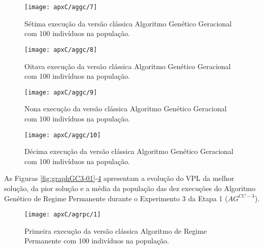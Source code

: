 \begin{figure}[H]
\centering
\texttt{[image: apxC/aggc/7]}
\caption{Sétima execução da versão clássica Algoritmo Genético Geracional com 100 indivíduos na população.}
\label{fig:graphGC3-07}
\end{figure}

\begin{figure}[H]
\centering
\texttt{[image: apxC/aggc/8]}
\caption{Oitava execução da versão clássica Algoritmo Genético Geracional com 100 indivíduos na população.}
\label{fig:graphGC3-08}
\end{figure}

\begin{figure}[H]
\centering
\texttt{[image: apxC/aggc/9]}
\caption{Nona execução da versão clássica Algoritmo Genético Geracional com 100 indivíduos na população.}
\label{fig:graphGC3-09}
\end{figure}

\begin{figure}[H]
\centering
\texttt{[image: apxC/aggc/10]}
\caption{Décima execução da versão clássica Algoritmo Genético Geracional com 100 indivíduos na população.}
\label{fig:graphGC3-10}
\end{figure}

As Figuras \ref{fig:graphGC3-01}-\ref{fig:graphGC3-10} apresentam a evolução do VPL da melhor solução, da pior solução e a média da população das dez execuções do Algoritmo Genético de Regime Permanente durante o Experimento 3 da Etapa 1 ($AG^{CC-3}$).

\begin{figure}[H]
\centering
\texttt{[image: apxC/agrpc/1]}
\caption{Primeira execução da versão clássica Algoritmo de Regime Permanente com 100 indivíduos na população.}
\label{fig:graphRPC3-01}
\end{figure}

